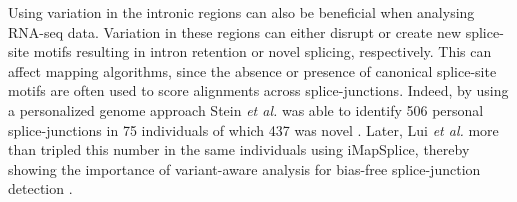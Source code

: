 Using variation in the intronic regions can also be beneficial when analysing RNA-seq data. 
Variation in these regions can either disrupt or create new splice-site motifs resulting in intron retention or novel splicing, respectively. 
This can affect mapping algorithms, since the absence or presence of canonical splice-site motifs are often used to score alignments across splice-junctions. 
Indeed, by using a personalized genome approach Stein \textit{et al.} was able to identify 506 personal splice-junctions in 75 individuals of which 437 was novel \cite{Stein_2015}. 
Later, Lui \textit{et al.} more than tripled this number in the same individuals using iMapSplice, thereby showing the importance of variant-aware analysis for bias-free splice-junction detection \cite{Liu_2018}.



